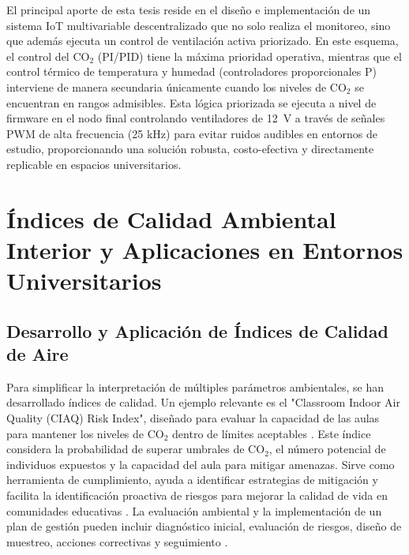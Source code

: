 El principal aporte de esta tesis reside en el diseño e implementación de un sistema IoT multivariable descentralizado que no solo realiza el monitoreo, sino que además ejecuta un control de ventilación activa priorizado. En este esquema, el control del CO\(_2\) (PI/PID) tiene la máxima prioridad operativa, mientras que el control térmico de temperatura y humedad (controladores proporcionales P) interviene de manera secundaria únicamente cuando los niveles de CO\(_2\) se encuentran en rangos admisibles. Esta lógica priorizada se ejecuta a nivel de firmware en el nodo final controlando ventiladores de 12~V a través de señales PWM de alta frecuencia (25 kHz) para evitar ruidos audibles en entornos de estudio, proporcionando una solución robusta, costo-efectiva y directamente replicable en espacios universitarios.



\section{Índices de Calidad Ambiental Interior y Aplicaciones en Entornos Universitarios}

\subsection{Desarrollo y Aplicación de Índices de Calidad de Aire}
Para simplificar la interpretación de múltiples parámetros ambientales, se han desarrollado índices de calidad. Un ejemplo relevante es el "Classroom Indoor Air Quality (CIAQ) Risk Index", diseñado para evaluar la capacidad de las aulas para mantener los niveles de CO\(_2\) dentro de límites aceptables \cite{lopez_carreno_2025}. Este índice considera la probabilidad de superar umbrales de CO\(_2\), el número potencial de individuos expuestos y la capacidad del aula para mitigar amenazas. Sirve como herramienta de cumplimiento, ayuda a identificar estrategias de mitigación y facilita la identificación proactiva de riesgos para mejorar la calidad de vida en comunidades educativas \cite{lopez_carreno_2025}. La evaluación ambiental y la implementación de un plan de gestión pueden incluir diagnóstico inicial, evaluación de riesgos, diseño de muestreo, acciones correctivas y seguimiento \cite{higiene_ambiental_nodate}.

